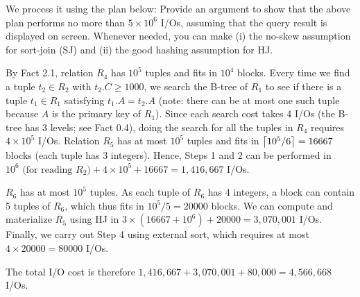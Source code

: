 We process it using the plan below:
\noindent Provide an argument to show that the above plan performs no more than $5 \times 10^6$ I/Os, assuming that the query result is displayed on screen. Whenever needed, you can make (i) the no-skew assumption for sort-join (SJ) and (ii) the good hashing assumption for HJ.

\begin{sol}
     By Fact 2.1, relation $R_4$ has $10^5$ tuples and fits in $10^4$ blocks. Every time we find a tuple $t_2 \in R_2$ with $t_2.C \ge 1000$, we search the B-tree of $R_1$ to see if there is a tuple $t_1 \in R_1$ satisfying $t_1.A = t_2.A$ (note: there can be at most one such tuple because $A$ is the primary key of $R_1$). Since each search cost takes 4 I/Os (the B-tree has 3 levels; see Fact 0.4), doing the search for all the tuples in $R_4$ requires $4 \times 10^5$ I/Os. Relation $R_5$ has at most $10^5$ tuples and fits in $\left \lceil 10^5 / 6 \right \rceil = 16667$ blocks (each tuple has 3 integers). Hence, Steps 1 and 2 can be performed in $
        10^6 \text{ (for reading $R_2$)} + 4 \times 10^5 + 16667 = 1,416,667
    $ I/Os.

    \vgap

    $R_6$ has at most $10^5$ tuples. As each tuple of $R_6$ has 4 integers, a block can contain 5 tuples of $R_6$, which thus fits in $10^5 / 5 = 20000$ blocks. We can compute  and materialize $R_5$ using HJ in $3 \times (16667 + 10^6) + 20000 = 3,070,001$ I/Os.
    Finally, we carry out Step 4 using external sort, which requires at most $4 \times 20000 = 80000$ I/Os.

    \vgap

    The total I/O cost is therefore $1,416,667 + 3,070,001 + 80,000 =4,566,668$ I/Os.
\end{sol}



